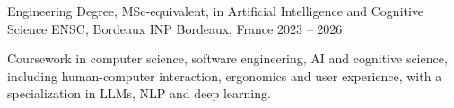 
\begin{cventries}
  \cventry
    {Engineering Degree, MSc-equivalent, in Artificial Intelligence and Cognitive Science}
    {ENSC, Bordeaux INP}
    {Bordeaux, France}
    {2023 -- 2026}
    {
      \begin{cvitems}
        \item {Coursework in computer science, software engineering, AI and cognitive science, including human-computer interaction, ergonomics and user experience, with a specialization in LLMs, NLP and deep learning.}
      \end{cvitems}
    }
\end{cventries}
